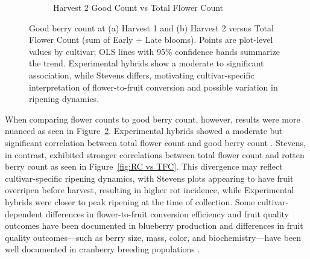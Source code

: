 \begin{figure}[!ht]
\begin{subfigure}{0.45\textwidth}
   \caption{Harvest 2 Good Count vs Total Flower Count}
    \label{fig:H2 GC vs TFC}
  \end{subfigure}
  \caption{Good berry count at (a) Harvest 1 and (b) Harvest 2 versus Total Flower Count (sum of Early + Late blooms). Points are plot-level values by cultivar; OLS lines with 95\% confidence bands summarize the trend. Experimental hybrids show a moderate to significant association, while Stevens differs, motivating cultivar-specific interpretation of flower-to-fruit conversion and possible variation in ripening dynamics.}
  \label{fig:GC vs TFC}
\end{figure}


When comparing flower counts to good berry count, however, results were more nuanced as seen in Figure~\ref{fig:GC vs TFC}. Experimental hybrids showed a moderate but significant correlation between total flower count and good berry count . Stevens, in contrast, exhibited stronger correlations between total flower count and rotten berry count  as seen in Figure~\ref{fig:RC vs TFC}. This divergence may reflect cultivar-specific ripening dynamics, with Stevens plots appearing to have fruit overripen before harvest, resulting in higher rot incidence, while Experimental hybrids were closer to peak ripening at the time of collection. Some cultivar-dependent differences in flower-to-fruit conversion efficiency and fruit quality outcomes have been documented in blueberry production \cite{cortes-rivas_pollination_2023} and differences in fruit quality outcomes—such as berry size, mass, color, and biochemistry—have been well documented in cranberry breeding populations \cite{loarca_berryportraits_2024,maule_buds_2024}.

